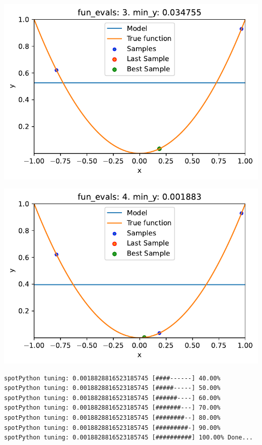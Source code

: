 \documentclass[
  letterpaper,
  DIV=11,
  numbers=noendperiod]{scrreprt}
\begin{document}
\includegraphics{010_num_spot_sklearn_surrogate_files/figure-pdf/cell-43-output-1.pdf}

\includegraphics{010_num_spot_sklearn_surrogate_files/figure-pdf/cell-43-output-2.pdf}

\begin{verbatim}
spotPython tuning: 0.0018828816523185745 [####------] 40.00% 
spotPython tuning: 0.0018828816523185745 [#####-----] 50.00% 
spotPython tuning: 0.0018828816523185745 [######----] 60.00% 
spotPython tuning: 0.0018828816523185745 [#######---] 70.00% 
spotPython tuning: 0.0018828816523185745 [########--] 80.00% 
spotPython tuning: 0.0018828816523185745 [#########-] 90.00% 
spotPython tuning: 0.0018828816523185745 [##########] 100.00% Done...
\end{verbatim}
\end{document}
